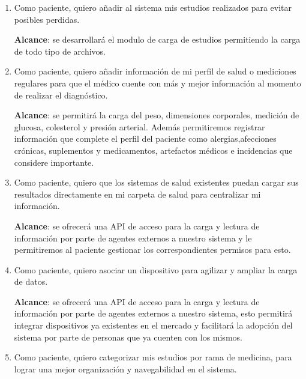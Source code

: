 	\begin{enumerate}           
	\item Como paciente, quiero  añadir al sistema mis estudios realizados para evitar posibles perdidas.
    
    \textbf{Alcance}: se desarrollará el modulo de carga de estudios permitiendo la carga de todo tipo de archivos.
	\item Como paciente, quiero  añadir información de mi perfil de salud o mediciones regulares para que el médico cuente con más y mejor información al momento de realizar el diagnóstico.
    
    \textbf{Alcance}: se permitirá la carga del peso, dimensiones corporales, medición de glucosa, colesterol y presión arterial. 
    Además permitiremos registrar información que complete el perfil del paciente como alergias,afecciones crónicas, suplementos y medicamentos, artefactos médicos e incidencias que considere importante.
	\item Como paciente, quiero que los sistemas de salud existentes puedan cargar sus resultados directamente en mi carpeta de salud para centralizar mi información.
    
    \textbf{Alcance}: se ofrecerá una API de acceso para la carga y lectura de información por parte de agentes externos a nuestro sistema y le permitiremos al paciente gestionar los correspondientes permisos para esto.
    
	\item Como paciente, quiero asociar un dispositivo para agilizar y ampliar la carga de datos.
    
   \textbf{Alcance}: se ofrecerá una API de acceso para la carga y lectura de información por parte de agentes externos a nuestro sistema, esto permitirá integrar dispositivos ya existentes en el mercado y facilitará la adopción del sistema por parte de personas que ya cuenten con los mismos.
	\item Como paciente, quiero categorizar mis estudios por rama de medicina, para lograr una mejor organización y navegabilidad en el sistema.
    

\end{enumerate}
